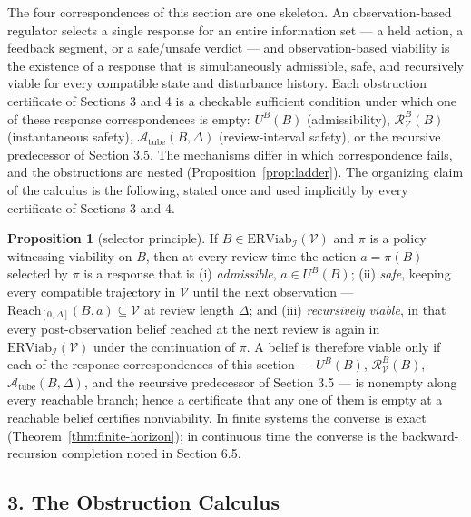 \documentclass[10pt,twocolumn]{article}
\theoremstyle{definition}
\newtheorem{proposition}{Proposition}
\begin{document}
The four correspondences of this section are one skeleton. An
observation-based regulator selects a single response for an entire
information set --- a held action, a feedback segment, or a
safe/unsafe verdict --- and observation-based viability is the existence
of a response that is simultaneously admissible, safe, and recursively
viable for every compatible state and disturbance history. Each
obstruction certificate of Sections 3 and 4 is a checkable sufficient
condition under which one of these response correspondences is empty:
\(U^B(B)\) (admissibility), \(\mathcal{R}_{\mathcal{V}}^B(B)\)
(instantaneous safety), \(\mathcal{A}_{\mathrm{tube}}(B,\Delta)\)
(review-interval safety), or the recursive predecessor of Section 3.5.
The mechanisms differ in which correspondence fails, and the
obstructions are nested (Proposition~\ref{prop:ladder}). The organizing
claim of the calculus is the following, stated once and used implicitly
by every certificate of Sections 3 and 4.

\begin{proposition}[selector principle]\label{prop:selector}
If \(B\in\mathrm{ERViab}_{\mathcal{I}}(\mathcal{V})\) and \(\pi\) is a
policy witnessing viability on \(B\), then at every review time the
action \(a=\pi(B)\) selected by \(\pi\) is a response that is
(i) \emph{admissible}, \(a\in U^B(B)\); (ii) \emph{safe}, keeping every
compatible trajectory in \(\mathcal{V}\) until the next observation ---
\(\mathrm{Reach}_{[0,\Delta]}(B,a)\subseteq\mathcal{V}\) at review
length \(\Delta\); and (iii) \emph{recursively viable}, in that every
post-observation belief reached at the next review is again in
\(\mathrm{ERViab}_{\mathcal{I}}(\mathcal{V})\) under the continuation
of \(\pi\). A belief is therefore viable only if each of the response
correspondences of this section --- \(U^B(B)\),
\(\mathcal{R}_{\mathcal{V}}^B(B)\), \(\mathcal{A}_{\mathrm{tube}}(B,\Delta)\),
and the recursive predecessor of Section 3.5 --- is nonempty along
every reachable branch; hence a certificate that any one of them is
empty at a reachable belief certifies nonviability. In finite systems
the converse is exact (Theorem~\ref{thm:finite-horizon}); in continuous
time the converse is the backward-recursion completion noted in
Section 6.5.
\end{proposition}



\subsection{3. The Obstruction Calculus}\label{the-obstruction-calculus}
\end{document}
